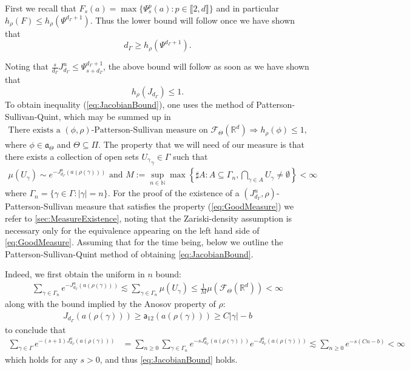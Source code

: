 \documentclass{report}
\begin{document}
First we recall that $F_s(a) = \max \{ \Psi_s^p(a) : p \in \llbracket 2, d \rrbracket\}$ and in particular $h_\rho(F) \leq h_\rho(\Psi^{d_\Gamma + 1})$.
Thus the lower bound will follow once we have shown that
$$d_\Gamma \geq h_\rho(\Psi^{d_\Gamma + 1}).$$

Noting that $\frac{s}{d_\Gamma} J_{d_\Gamma}^u \leq \Psi_{s+d_\Gamma}^{d_\Gamma + 1}$, the above bound will follow as soon as we have shown that
\begin{equation}\label{eq:JacobianBound}
    h_\rho(J_{d_\Gamma}) \leq 1.\tag{LB}
\end{equation}
To obtain inequality (\ref{eq:JacobianBound}), one uses the method of Patterson-Sullivan-Quint, which may be summed up in
\begin{align*}
    \text{There exists a } (\phi, \rho)\text{-Patterson-Sullivan measure on } \mathcal F_\Theta(\mathbb R^d) 
    \Rightarrow h_\rho(\phi) \leq 1,
\end{align*}
where $\phi \in \mathfrak a_\Theta$ and $ \Theta \subseteq \Pi$.
The property that we will need of our measure is that there exists a collection of open sets ${U_\gamma}_\gamma \in \Gamma$ such that
\begin{align*}\label{eq:GoodMeasure}
    \mu(U_\gamma) \sim e^{-J_{d_\Gamma}^u(a(\rho(\gamma)))} \text{ and } 
    M := \sup_{n \in \mathbb N}
    \max
    \left\{\sharp A : A \subseteq \Gamma_n,  \bigcap_{\gamma \in A}U_\gamma \neq \emptyset \right\} < \infty\tag{MP}
\end{align*}
where $\Gamma_n = \{ \gamma \in \Gamma : |\gamma| = n \} $.
For the proof of the existence of a $(J_{d_\Gamma}^u, \rho)$-Patterson-Sullivan measure that satisfies the property (\ref{eq:GoodMeasure}) we refer to \cref{sec:MeasureExistence}, noting that the Zariski-density assumption is necessary only for the equivalence appearing on the left hand side of \cref{eq:GoodMeasure}.
Assuming that for the time being, below we outline the Patterson-Sullivan-Quint method of obtaining \cref{eq:JacobianBound}.

Indeed, we first obtain the uniform in $n$ bound:
\begin{align*}
    \sum_{\gamma \in \Gamma_n}
    e^{-J_{d_\Gamma}^u(a(\rho(\gamma)))} \lesssim
    \sum_{\gamma \in \Gamma_n}
    \mu(U_\gamma) \leq \frac{1}{M} \mu(\mathcal F_\Theta(\mathbb R^d)) < \infty
\end{align*}
along with the bound implied by the Anosov property of $\rho$:
\begin{align*}
J_{d_\Gamma}(a(\rho(\gamma))) \geq \mathsf a_{12} (a(\rho(\gamma))) \geq C|\gamma| - b
\end{align*}
to conclude that
\begin{align*}
\sum_{\gamma \in \Gamma} e^{-(s+1)J^u_{d_\Gamma}(a(\rho(\gamma)))} &=
\sum_{n\geq 0} \sum_{\gamma \in \Gamma_n} e^{-s J^u_{d_\Gamma}(a(\rho(\gamma)))}
    e^{-J^u_{d_\Gamma}(a(\rho(\gamma)))} \lesssim
\sum_{n\geq 0} e^{-s(Cn - b)} < \infty
\end{align*}
which holds for any $s>0$, and thus \cref{eq:JacobianBound} holds.
\end{document}
